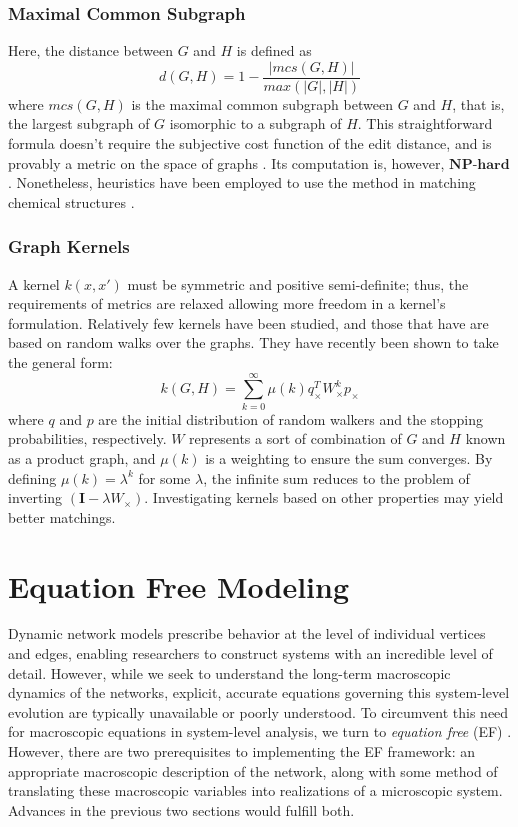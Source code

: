 \documentclass[11pt]{article}
\begin{document}
\subsubsection{Maximal Common Subgraph}
\indent Here, the distance between $G$ and $H$ is defined as
\[
d(G,H) = 1 - \frac{|mcs(G, H)|}{max(|G|,|H|)}
\]
where $mcs(G,H)$ is the maximal common subgraph between $G$ and $H$, that is, the largest subgraph of $G$ isomorphic to a subgraph of $H$. This straightforward formula doesn't require the subjective cost function of the edit distance, and is provably a metric on the space of graphs \cite{thePaper}. Its computation is, however, $\textbf{NP-hard}$. Nonetheless, heuristics have been employed to use the method in matching chemical structures \cite{heuristicsChemicalGraphs}.
\subsubsection{Graph Kernels}
\indent A kernel $k(x,x')$ must be symmetric and positive semi-definite; thus, the requirements of metrics are relaxed allowing more freedom in a kernel's formulation. Relatively few kernels have been studied, and those that have are based on random walks over the graphs. They have recently been shown to take the general form:
\[
k(G,H) = \sum\limits_{k=0}^{\infty}\mu(k)q_{\times}^{T}W_{\times}^{k}p_{\times}
\]
where $q$ and $p$ are the initial distribution of random walkers and the stopping probabilities, respectively. $W$ represents a sort of combination of $G$ and $H$ known as a product graph, and $\mu(k)$ is a weighting to ensure the sum converges. By defining $\mu(k) = \lambda^{k}$ for some $\lambda$, the infinite sum reduces to the problem of inverting $( \textbf{I} - \lambda W_{\times} )$. Investigating kernels based on other properties may yield better matchings.
\section{Equation Free Modeling}
\indent Dynamic network models prescribe behavior at the level of individual vertices and edges, enabling researchers to construct systems with an incredible level of detail. However, while we seek to understand the long-term macroscopic dynamics of the networks, explicit, accurate equations governing this system-level evolution are typically unavailable or poorly understood. To circumvent this need for macroscopic equations in system-level analysis, we turn to \textit{equation free} (EF) . However, there are two prerequisites to implementing the EF framework: an appropriate macroscopic description of the network, along with some method of translating these macroscopic variables into realizations of a microscopic system. Advances in the previous two sections would fulfill both. 
\end{document}
